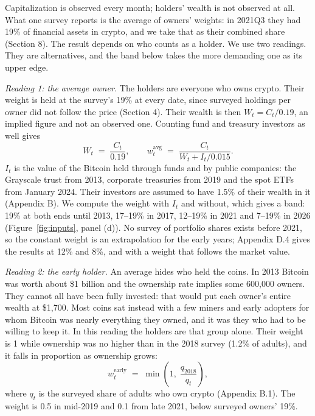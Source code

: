 \documentclass[11pt]{article}
\begin{document}
Capitalization is observed every month; holders' wealth is not observed at all. What one survey reports is the average of owners' weights: in 2021Q3 they had 19\% of financial assets in crypto, and we take that as their combined share (Section 8). The result depends on who counts as a holder. We use two readings. They are alternatives, and the band below takes the more demanding one as its upper edge.

\emph{Reading 1: the average owner.} The holders are everyone who owns crypto. Their weight is held at the survey's 19\% at every date, since surveyed holdings per owner did not follow the price (Section 4). Their wealth is then $W_t = C_t/0.19$, an implied figure and not an observed one. Counting fund and treasury investors as well gives
\begin{equation}
W_t \;=\; \frac{C_t}{0.19}, \qquad w^{\text{avg}}_t \;=\; \frac{C_t}{W_t + I_t/0.015}.
\label{eq:wavg}
\end{equation}
$I_t$ is the value of the Bitcoin held through funds and by public companies: the Grayscale trust from 2013, corporate treasuries from 2019 and the spot ETFs from January 2024. Their investors are assumed to have 1.5\% of their wealth in it (Appendix B). We compute the weight with $I_t$ and without, which gives a band: 19\% at both ends until 2013, 17--19\% in 2017, 12--19\% in 2021 and 7--19\% in 2026 (Figure~\ref{fig:inputs}, panel (d)). No survey of portfolio shares exists before 2021, so the constant weight is an extrapolation for the early years; Appendix D.4 gives the results at 12\% and 8\%, and with a weight that follows the market value.

\emph{Reading 2: the early holder.} An average hides who held the coins. In 2013 Bitcoin was worth about \$1 billion and the ownership rate implies some 600,000 owners. They cannot all have been fully invested: that would put each owner's entire wealth at \$1,700. Most coins sat instead with a few miners and early adopters for whom Bitcoin was nearly everything they owned, and it was they who had to be willing to keep it. In this reading the holders are that group alone. Their weight is 1 while ownership was no higher than in the 2018 survey (1.2\% of adults), and it falls in proportion as ownership grows:
\begin{equation}
w^{\text{early}}_t \;=\; \min\!\left(1,\; \frac{q_{2018}}{q_t}\right),
\label{eq:wearly}
\end{equation}
where $q_t$ is the surveyed share of adults who own crypto (Appendix B.1). The weight is 0.5 in mid-2019 and 0.1 from late 2021, below surveyed owners' 19\%.
\end{document}
